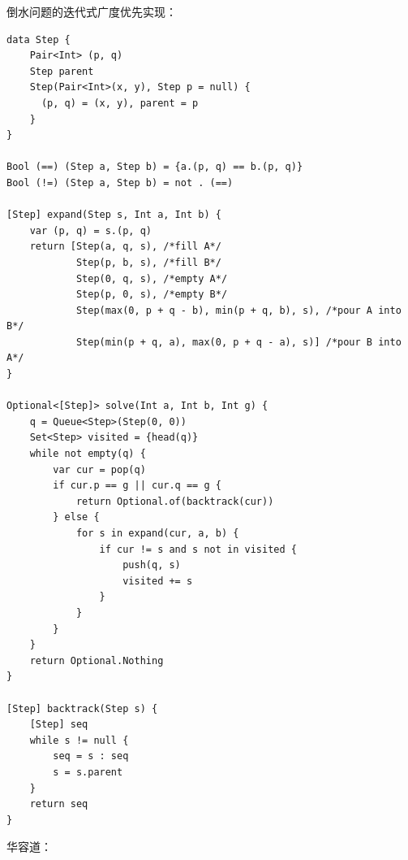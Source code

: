 \documentclass[b5paper]{ctexart}
\begin{document}
倒水问题的迭代式广度优先实现：

\begin{lstlisting}[language = Bourbaki]
data Step {
    Pair<Int> (p, q)
    Step parent
    Step(Pair<Int>(x, y), Step p = null) {
      (p, q) = (x, y), parent = p
    }
}

Bool (==) (Step a, Step b) = {a.(p, q) == b.(p, q)}
Bool (!=) (Step a, Step b) = not . (==)

[Step] expand(Step s, Int a, Int b) {
    var (p, q) = s.(p, q)
    return [Step(a, q, s), /*fill A*/
            Step(p, b, s), /*fill B*/
            Step(0, q, s), /*empty A*/
            Step(p, 0, s), /*empty B*/
            Step(max(0, p + q - b), min(p + q, b), s), /*pour A into B*/
            Step(min(p + q, a), max(0, p + q - a), s)] /*pour B into A*/
}

Optional<[Step]> solve(Int a, Int b, Int g) {
    q = Queue<Step>(Step(0, 0))
    Set<Step> visited = {head(q)}
    while not empty(q) {
        var cur = pop(q)
        if cur.p == g || cur.q == g {
            return Optional.of(backtrack(cur))
        } else {
            for s in expand(cur, a, b) {
                if cur != s and s not in visited {
                    push(q, s)
                    visited += s
                }
            }
        }
    }
    return Optional.Nothing
}

[Step] backtrack(Step s) {
    [Step] seq
    while s != null {
        seq = s : seq
        s = s.parent
    }
    return seq
}
\end{lstlisting}

华容道：
\end{document}

